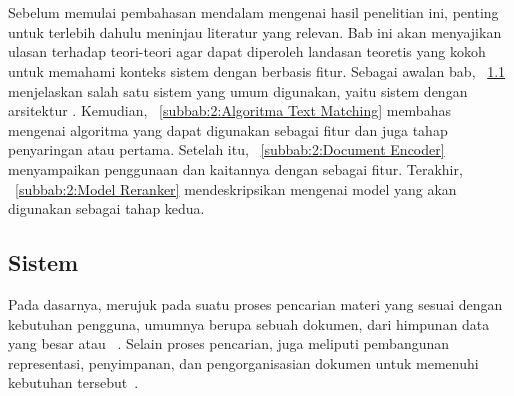 \chapter{\babDua}
\label{bab:2}
Sebelum memulai pembahasan mendalam mengenai hasil penelitian ini, penting untuk terlebih dahulu meninjau literatur yang relevan. Bab ini akan menyajikan ulasan terhadap teori-teori agar dapat diperoleh landasan teoretis yang kokoh untuk memahami konteks sistem \ir{} dengan \reranker{} berbasis fitur. Sebagai awalan bab, \subbab{}~\ref{subbab:2:Sistem Information Retrieval} menjelaskan salah satu sistem \ir{} yang umum digunakan, yaitu sistem dengan arsitektur \cascaded{}. Kemudian, \subbab{}~\ref{subbab:2:Algoritma Text Matching} membahas mengenai algoritma yang dapat digunakan sebagai fitur dan juga tahap penyaringan atau \ranking{} pertama. Setelah itu, \subbab{}~\ref{subbab:2:Document Encoder} menyampaikan penggunaan \encoder{} dan kaitannya dengan \ir{} sebagai fitur. Terakhir, \subbab{}~\ref{subbab:2:Model Reranker} mendeskripsikan mengenai model \reranker{} yang akan digunakan sebagai tahap \ranking{} kedua.





\section{Sistem \ir{}}
\label{subbab:2:Sistem Information Retrieval}
Pada dasarnya, \ir{} merujuk pada suatu proses pencarian materi yang sesuai dengan kebutuhan pengguna, umumnya berupa sebuah dokumen, dari himpunan data yang besar atau \corpus{}~\citep{schutze2008introduction}. Selain proses pencarian, \ir{} juga meliputi pembangunan representasi, penyimpanan, dan pengorganisasian dokumen untuk memenuhi kebutuhan tersebut~\citep{baeza1999modern}.

